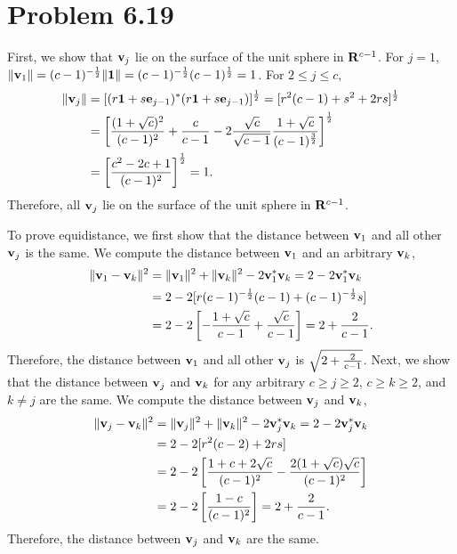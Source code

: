 \documentclass{scrartcl}
\begin{document}

\section*{Problem 6.19}

First, we show that $\mathbf{v}_j$ lie on the surface of the unit sphere in $\mathbf{R}^{c-1}$.
For $j = 1$, $\|\mathbf{v}_1\| = (c-1)^{-{1 \over 2}} \|\mathbf{1}\| = (c-1)^{-{1 \over 2}}(c-1)^{1 \over 2} = 1$.
For $2 \le j \le c$, 
\begin{equation}
\begin{split}
\|\mathbf{v}_j\| & = [ (r\mathbf{1}+s\mathbf{e}_{j-1})^*(r\mathbf{1}+s\mathbf{e}_{j-1}) ]^{1 \over 2} = [ r^2(c-1) + s^2 + 2rs ]^{1 \over 2} \\
& = \left[ { {(1+\sqrt{c})^2} \over {(c-1)^2} } + {c \over {c-1}} - 2 {\sqrt{c} \over \sqrt{c-1}} {{1+\sqrt{c}} \over {(c-1)^{3 \over 2}}} \right]^{1 \over 2} \\
& = \left[ {{c^2-2c+1} \over {(c-1)^2}} \right]^{1 \over 2} = 1.
\end{split}
\end{equation}
Therefore, all $\mathbf{v}_j$ lie on the surface of the unit sphere in $\mathbf{R}^{c-1}$.

To prove equidistance, we first show that the distance between $\mathbf{v}_1$ and all other $\mathbf{v}_j$ is the same. We compute the distance between $\mathbf{v}_1$
and an arbitrary $\mathbf{v}_k$,
\begin{equation}
\begin{split}
\|\mathbf{v}_1 - \mathbf{v}_k\|^2 & = \|\mathbf{v}_1\|^2+\|\mathbf{v}_k\|^2 - 2 \mathbf{v}_1^*\mathbf{v}_k = 2 - 2 \mathbf{v}_1^*\mathbf{v}_k \\
& = 2 - 2 [ r(c-1)^{-{1\over 2}}(c-1)+(c-1)^{-{1\over 2}}s ]\\
& = 2 - 2 \left[ -{{1+\sqrt{c}} \over {c-1}} + {\sqrt{c} \over {c-1}}\right] = 2 + {2 \over {c-1}}.
\end{split}
\end{equation}
Therefore, the distance between $\mathbf{v}_1$ and all other $\mathbf{v}_j$ is $\sqrt{2 + {2 \over {c-1}}}$.
Next, we show that the distance between $\mathbf{v}_j$ and $\mathbf{v}_k$ for any arbitrary $c \ge j \ge 2$, $c \ge k \ge 2$, and $k \neq j$ are the same.
We compute the distance between $\mathbf{v}_j$ and $\mathbf{v}_k$,
\begin{equation}
\begin{split}
\|\mathbf{v}_j - \mathbf{v}_k\|^2 & = \|\mathbf{v}_j\|^2+\|\mathbf{v}_k\|^2 - 2 \mathbf{v}_j^*\mathbf{v}_k = 2 - 2 \mathbf{v}_j^*\mathbf{v}_k \\
& = 2 - 2 [r^2(c-2) + 2rs ] \\
& = 2 - 2 \left[ {{1+c+2\sqrt{c}} \over {(c-1)^2}} - {{2(1+\sqrt{c})\sqrt{c}} \over {(c-1)^2}}\right] \\
& = 2 - 2 \left[ {{1-c} \over {(c-1)^2}} \right] = 2 + {2 \over {c-1}}.
\end{split}
\end{equation}
Therefore, the distance between $\mathbf{v}_j$ and $\mathbf{v}_k$ are the same.
\end{document}
